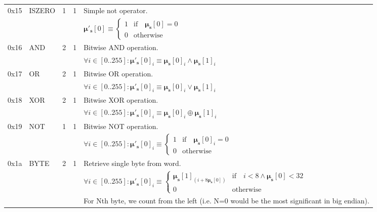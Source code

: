 \documentclass[9pt,oneside]{amsart}
\begin{document}
\begin{tabular*}{\columnwidth}[h]{rlrrl}
\midrule
0x15 & {\small ISZERO} & 1 & 1 & Simple not operator. \\
&&&& $\boldsymbol{\mu}'_\mathbf{s}[0] \equiv \begin{cases} 1 & \text{if} \quad \boldsymbol{\mu}_\mathbf{s}[0] = 0 \\ 0 & \text{otherwise} \end{cases}$ \\
\midrule
0x16 & {\small AND} & 2 & 1 & Bitwise AND operation. \\
&&&& $\forall i \in [0..255]: \boldsymbol{\mu}'_\mathbf{s}[0]_i \equiv \boldsymbol{\mu}_\mathbf{s}[0]_i \wedge \boldsymbol{\mu}_\mathbf{s}[1]_i$ \\
\midrule
0x17 & {\small OR} & 2 & 1 & Bitwise OR operation. \\
&&&& $\forall i \in [0..255]: \boldsymbol{\mu}'_\mathbf{s}[0]_i \equiv \boldsymbol{\mu}_\mathbf{s}[0]_i \vee \boldsymbol{\mu}_\mathbf{s}[1]_i$ \\
\midrule
0x18 & {\small XOR} & 2 & 1 & Bitwise XOR operation. \\
&&&& $\forall i \in [0..255]: \boldsymbol{\mu}'_\mathbf{s}[0]_i \equiv \boldsymbol{\mu}_\mathbf{s}[0]_i \oplus \boldsymbol{\mu}_\mathbf{s}[1]_i$ \\
\midrule
0x19 & {\small NOT} & 1 & 1 & Bitwise NOT operation. \\
&&&& $\forall i \in [0..255]: \boldsymbol{\mu}'_\mathbf{s}[0]_i \equiv \begin{cases} 1 & \text{if} \quad \boldsymbol{\mu}_\mathbf{s}[0]_i = 0 \\ 0 & \text{otherwise} \end{cases}$ \\
\midrule
0x1a & {\small BYTE} & 2 & 1 & Retrieve single byte from word. \\
&&&& $\forall i \in [0..255]: \boldsymbol{\mu}'_\mathbf{s}[0]_i \equiv \begin{cases} \boldsymbol{\mu}_\mathbf{s}[1]_{(i + 8\boldsymbol{\mu}_\mathbf{s}[0])} & \text{if} \quad i < 8 \wedge \boldsymbol{\mu}_\mathbf{s}[0] < 32 \\ 0 & \text{otherwise} \end{cases} $\\
&&&& For Nth byte, we count from the left (i.e. N=0 would be the most significant in big endian). \\
\bottomrule
\end{tabular*}
\end{document}
